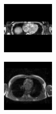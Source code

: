 \begin{figure}[htb]
\begin{subfigure}[b]{0.25\textwidth}
        \end{subfigure}%
        \begin{subfigure}[b]{0.25\textwidth}
                \centering
                \includegraphics[width=.95\linewidth]{img_hyperopt/Abdomen_5115}
        \end{subfigure}%
        \begin{subfigure}[b]{0.25\textwidth}
                \centering
                \includegraphics[width=.95\linewidth]{img_hyperopt/Chest_6810}
        \end{subfigure}
        

\end{figure}
